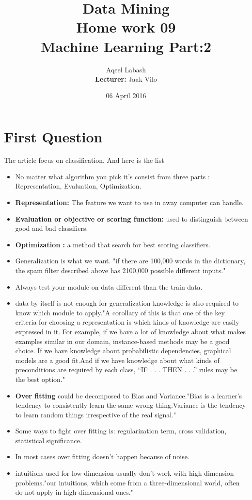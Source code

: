 \documentclass{article}
\title{Data Mining\\
		Home work 09\\Machine Learning Part:2 }
\author{Aqeel Labash\\ \textbf{Lecturer:} Jaak Vilo}
\date{06 April 2016}
\begin{document}
	\maketitle
\section*{First Question}
The article focus on classification. And here is the list 
\begin{itemize}
	\item No matter what algorithm you pick it's consist from three parts : Representation, Evaluation, Optimization.
	\item \textbf{Representation:} The feature we want to use in away computer can handle.
	\item \textbf{Evaluation or objective or scoring function:} used to distinguish between good and bad classifiers.
	\item \textbf{Optimization :} a method that search for best scoring classifiers.
	\item Generalization is what we want. "if there are 100,000 words in the dictionary, the spam filter described above has 2100,000 possible different inputs."
	\item Always test your module on data different than the train data.
	\item data by itself is not enough for generalization knowledge is also required to know which module to apply."A corollary of this is that one of the key criteria for choosing a representation is which kinds of knowledge are easily expressed in it. For example, if we have a lot of knowledge about what makes examples similar in our domain, instance-based methods may be a good choice. If we have knowledge about probabilistic dependencies, graphical models are a good fit.And if we have knowledge about what kinds of preconditions are required by each class, “IF . . . THEN . . .” rules may be the best option."
	\item \textbf{Over fitting} could be decomposed to Bias and Variance."Bias is a learner’s tendency to consistently learn the same wrong thing.Variance is the tendency to learn random things irrespective of the real signal." 
	\item Some ways to fight over fitting is: regularization term, cross validation, statistical significance.
	\item In most cases over fitting doesn't happen because of noise.
	\item intuitions used for low dimension usually don't  work with high dimension problems."our intuitions, which come from a three-dimensional world, often do not apply in high-dimensional ones."

\end{itemize}
\end{document}

